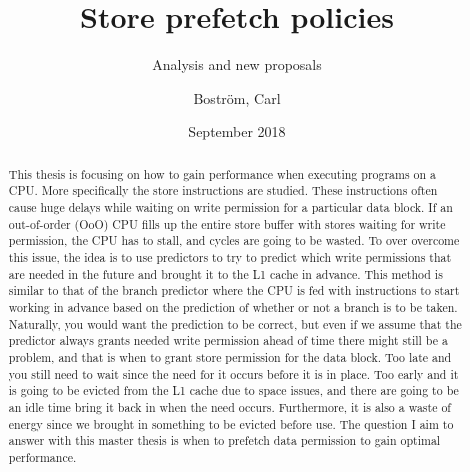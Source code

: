 \documentclass[a4paper,12pt]{article}
\title{Store prefetch policies}
\subtitle{Analysis and new proposals}
\author{Boström, Carl}
\date{September 2018}
\begin{document}
\maketitle
\frontmatter
\begin{abstract}
This thesis is focusing on how to gain performance when executing programs on a CPU. More specifically the store instructions are studied. These instructions often cause huge delays while waiting on write permission for a particular data block. If an out-of-order (OoO) CPU fills up the entire store buffer with stores waiting for write permission, the CPU has to stall, and cycles are going to be wasted. To over overcome this issue, the idea is to use predictors to try to predict which write permissions that are needed in the future and brought it to the L1 cache in advance. This method is similar to that of the branch predictor where the CPU is fed with instructions to start working in advance based on the prediction of whether or not a branch is to be taken. Naturally, you would want the prediction to be correct, but even if we assume that the predictor always grants needed write permission ahead of time there might still be a problem, and that is when to grant store permission for the data block. Too late and you still need to wait since the need for it occurs before it is in place. Too early and it is going to be evicted from the L1 cache due to space issues, and there are going to be an idle time bring it back in when the need occurs. Furthermore, it is also a waste of energy since we brought in something to be evicted before use. The question I aim to answer with this master thesis is when to prefetch data permission to gain optimal performance.
\end{abstract}
\end{document}

